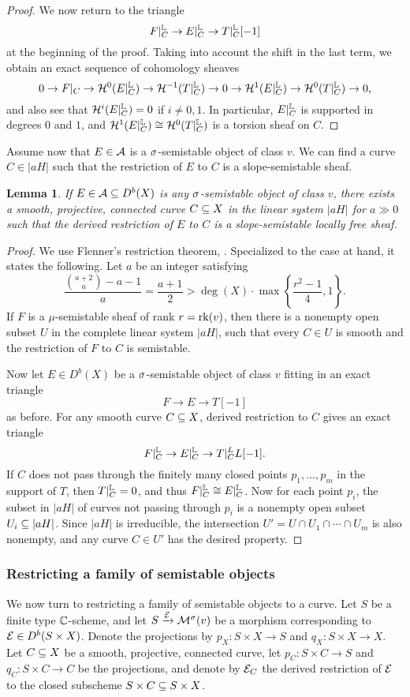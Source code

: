 \documentclass[letterpaper,11pt]{amsart}%
\newtheorem{lem}[thm]{Lemma}
\theoremstyle{remark}
\begin{document}
\begin{proof}
We now return to the triangle
\[ F|_C^{\mathbb{L}} \to E|_C^{\mathbb{L}} \to T|_C^{\mathbb{L}}[-1] \]
at the beginning of the proof. Taking into account the shift in the last term, we obtain an exact sequence of cohomology sheaves
\[ 0 \to F|_C \to \mathcal{H}^0(E|_C^{\mathbb{L}}) \to \mathcal{H}^{-1}(T|_C^{\mathbb{L}}) \to 0 \to \mathcal{H}^1(E|_C^{\mathbb{L}}) \to \mathcal{H}^0(T|_C^{\mathbb{L}}) \to 0, \]
and also see that $\mathcal{H}^i(E|_C^{\mathbb{L}}) = 0$ if $i \neq 0,1$. In particular, $E|_C^{\mathbb{L}}$ is supported in degrees $0$ and $1$, and $\mathcal{H}^1(E|_C^{\mathbb{L}}) \cong \mathcal{H}^0(T|_C^{\mathbb{L}})$ is a torsion sheaf on $C$.
\fi
\end{proof}

Assume now that $E \in \mathcal{A}$ is a $\sigma$-semistable object of class $v$. We can find a curve $C \in |a H|$ such that the restriction of $E$ to $C$ is a slope-semistable sheaf.
\begin{lem}\label{restsemistable}
    If $E \in \mathcal{A} \subseteq D^b(X)$ is any $\sigma$-semistable object of class $v$, there exists a smooth, projective, connected curve $C \subseteq X$ in the linear system $|a H|$ for $a \gg 0$ such that the derived restriction of $E$ to $C$ is a slope-semistable locally free sheaf.    
\end{lem}
\begin{proof} 
We use Flenner's restriction theorem, \cite[Theorem 7.1.1]{HL}. Specialized to the case at hand, it states the following. Let $a$ be an integer satisfying
\[ \frac{\binom{a+2}{a} - a - 1}{a} = \frac{a+1}{2} > \deg(X) \cdot \max\left\{\frac{r^2 - 1}{4}, 1\right\}. \]
If $F$ is a $\mu$-semistable sheaf of rank $r = \operatorname{\mathrm{rk}}(v)$, then there is a nonempty open subset $U$ in the complete linear system $|aH|$, such that every $C \in U$ is smooth and the restriction of $F$ to $C$ is semistable. 

Now let $E \in D^b(X)$ be a $\sigma$-semistable object of class $v$ fitting in an exact triangle
\[ F \to E \to T[-1] \]
as before. For any smooth curve $C \subseteq X$, derived restriction to $C$ gives an exact triangle
\[ F|_C^{\mathbb{L}} \to E|_C^{\mathbb{L}} \to T|_C^LL[-1]. \]
If $C$ does not pass through the finitely many closed points $p_1,\ldots,p_m$ in the support of $T$, then $T|_C^{\mathbb{L}} = 0$, and thus $F|_C^{\mathbb{L}} \cong E|_C^{\mathbb{L}}$. Now for each point $p_i$, the subset in $|a H|$ of curves not passing through $p_i$ is a nonempty open subset $U_i \subseteq |a H|$. Since $|a H|$ is irreducible, the intersection $U' = U \cap U_1 \cap \cdots \cap U_m$ is also nonempty, and any curve $C \in U'$ has the desired property. 
\end{proof}

\subsubsection{Restricting a family of semistable objects}
We now turn to restricting a family of semistable objects to a curve. Let $S$ be a finite type $\mathbb{C}$-scheme, and let $S \xrightarrow{\mathcal{E}} \mathcal{M}^\sigma(v)$ be a morphism corresponding to $\mathcal{E} \in D^b(S \times X)$. Denote the projections by $p_X: S \times X \to S$ and $q_X: S \times X \to X$. Let $C \subseteq X$ be a smooth, projective, connected curve, let $p_C: S \times C \to S$ and $q_C: S \times C \to C$ be the projections, and denote by $\mathcal{E}_C$ the derived restriction of $\mathcal{E}$ to the closed subscheme $S \times C \subseteq S \times X$.
\end{document}
